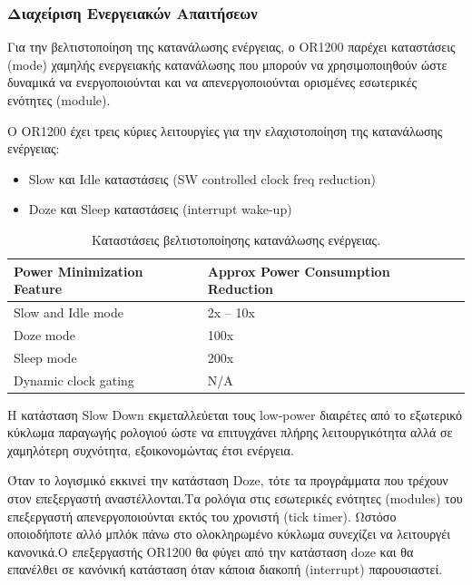 \documentclass[a4paper,10pt]{article}
\numberwithin{figure}{subsection}
\numberwithin{table}{subsection}
\begin{document}
{\subsubsection{Διαχείριση Ενεργειακών Απαιτήσεων}

Για την βελτιστοποίηση της κατανάλωσης ενέργειας, ο OR1200 παρέχει καταστάσεις (mode)
χαμηλής ενεργειακής κατανάλωσης που μπορούν να χρησιμοποιηθούν ώστε δυναμικά να ενεργοποιούνται
και να απενεργοποιούνται ορισμένες εσωτερικές ενότητες (module).
\newline

Ο OR1200 έχει τρεις κύριες λειτουργίες για την ελαχιστοποίηση της κατανάλωσης ενέργειας:
\begin{itemize}
 \item Slow και Idle καταστάσεις (SW controlled clock freq reduction)
 \item Doze και Sleep καταστάσεις (interrupt wake-up)
\end{itemize}

\setlength{\tabcolsep}{1em}
\begin{table}[h]
\begin{center}
\begin{tabular}{|l|l|}\hline
\rowcolor{tcA}
Power Minimization Feature & Approx Power Consumption Reduction\\\hline
Slow and Idle mode & 2x – 10x\\\hline
Doze mode & 100x\\\hline
Sleep mode & 200x\\\hline
Dynamic clock gating & N/A\\\hline
\end{tabular}
\end{center}
\caption{Καταστάσεις βελτιστοποίησης κατανάλωσης ενέργειας.}
\end{table}


Η κατάσταση Slow Down εκμεταλλεύεται τους low-power διαιρέτες από το εξωτερικό κύκλωμα 
παραγωγής ρολογιού ώστε να επιτυγχάνει πλήρης λειτουργικότητα αλλά σε χαμηλότερη συχνότητα,
εξοικονομώντας έτσι ενέργεια.
\newline

Όταν το λογισμικό εκκινεί την κατάσταση Doze, τότε τα προγράμματα που τρέχουν στον επεξεργαστή
αναστέλλονται.Τα ρολόγια στις εσωτερικές ενότητες (modules) του επεξεργαστή απενεργοποιούνται 
εκτός του χρονιστή (tick timer). Ωστόσο οποιοδήποτε αλλό μπλόκ πάνω στο ολοκληρωμένο κύκλωμα
συνεχίζει να λειτουργέι κανονικά.Ο επεξεργαστής OR1200 θα φύγει από την κατάσταση doze και 
θα επανέλθει σε κανόνική κατάσταση όταν κάποια διακοπή (interrupt) παρουσιαστεί.
\newline

}
\end{document}
